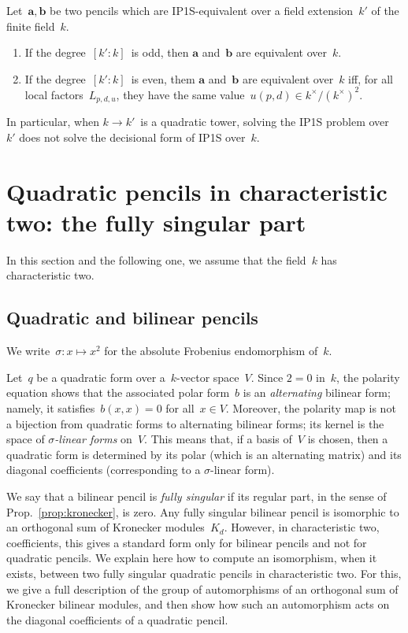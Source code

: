 \documentclass{article}%
\begin{document}
\begin{prop}\label{prop:IP1S-extension}
Let~$\bm{a}, \bm{b}$ be two pencils which are IP1S-equivalent over a
field extension~$k'$ of the finite field~$k$.
\begin{enumerate}
\item If the degree~$[k':k]$~is odd, then $\bm{a}$ and~$\bm{b}$ are
equivalent over~$k$.
\item If the degree~$[k':k]$~is even, them $\bm{a}$ and~$\bm{b}$ are
equivalent over~$k$ iff, for all local factors~$L_{p,d,u}$, they have the
same value~$u(p,d) ∈ k^{×}/(k^{×})^2$.
\end{enumerate}
\end{prop}

In particular, when $k → k'$~is a quadratic tower, solving the IP1S
problem over~$k'$ does not solve the decisional form of IP1S over~$k$.

\section{Quadratic pencils in characteristic two: the fully singular part}%
In this section and the following one, we assume that the field~$k$ has
characteristic two.

\subsection{Quadratic and bilinear pencils}%

We write~$σ: x ↦ x^2$ for the absolute Frobenius endomorphism of~$k$.

Let~$q$ be a quadratic form over a~$k$-vector space~$V$. Since $2 = 0$
in~$k$, the polarity equation shows that the associated polar form~$b$ is
an \emph{alternating} bilinear form; namely, it satisfies~$b(x,x) = 0$
for all~$x ∈ V$. Moreover, the polarity map is not a bijection from
quadratic forms to alternating bilinear forms; its kernel is the space of
\emph{$σ$-linear forms} on~$V$. This means that, if a basis of~$V$ is
chosen, then a quadratic form is determined by its polar (which is an
alternating matrix) and its diagonal coefficients (corresponding to a
$σ$-linear form).

\bigbreak

We say that a bilinear pencil is \emph{fully singular} if
its regular part, in the sense of Prop.~\ref{prop:kronecker}, is zero.
Any fully singular bilinear pencil is isomorphic to an orthogonal sum of
Kronecker modules~$K_d$. However, in characteristic two, 
coefficients, this gives a standard form only for
bilinear pencils and not for quadratic pencils. We explain here how to
compute an isomorphism, when it exists, between two fully singular
quadratic pencils in characteristic two. For this, we give a full
description of the group of automorphisms of an orthogonal sum of
Kronecker bilinear modules, and then show how such an automorphism acts
on the diagonal coefficients of a quadratic pencil.
\end{document}

